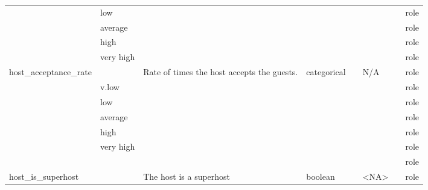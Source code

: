 \begin{center}
\begin{longtable}{@{}llllllll@{}}
                            & low                         &                                   &             &                &                             &                     & role \\
                            & average                     &                                   &             &                &                             &                     & role \\
                            & high                        &                                   &             &                &                             &                     & role \\
                            & very high                   &                                   &             &                &                             &                     & role \\
host\_acceptance\_rate      &                             & \multirow{5}{15ex}{Rate of times the host accepts the guests.} & categorical &                & N/A                         &                     & role \\
                            & v.low                       &                                   &             &                &                             &                     & role \\
                            & low                         &                                   &             &                &                             &                     & role \\
                            & average                     &                                   &             &                &                             &                     & role \\
                            & high                        &                                   &             &                &                             &                     & role \\
                            & very high                   &                                   &             &                &                             &                     & role \\
                            &                             &                                   &             &                &                             &                     & role \\
host\_is\_superhost         &                             & The host is a superhost & boolean &                & \textless{}NA\textgreater{} &                     & role \\

\end{longtable}
\end{center}
